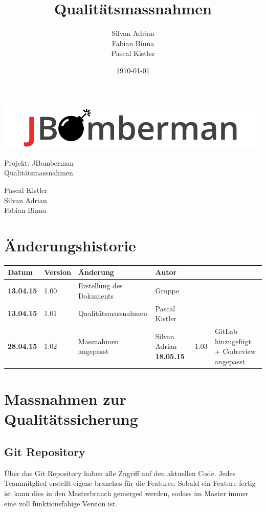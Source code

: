 \documentclass[11pt]{scrartcl}
\title{Qualitätsmassnahmen}
\author{Silvan Adrian \\ Fabian Binna \\ Pascal Kistler}
\date{\today{}}
\begin{document}
\def\arraystretch{1.5}
\begin{titlepage}
\begin{center}
\vspace{10em}
\includegraphics[scale=2]{jbomberman}
\vspace{10em}
\end{center}
\begin{center}
\huge {Projekt: JBomberman} \\
\huge {Qualitätsmassnahmen}
\end{center}
\begin{center}
\vspace{10em}
\LARGE {Pascal Kistler} \\
\LARGE {Silvan Adrian} \\
\LARGE {Fabian Binna}
\end{center}

\end{titlepage}

\newpage
\section{Änderungshistorie}
\label{sec:Änderungen}

\begin{tabularx}{\linewidth}{l l l l}
\textbf{Datum} & \textbf{Version} & \textbf{Änderung}  & \textbf{Autor} \\
\hline
\textbf{13.04.15} & 1.00 & Erstellung des Dokuments & Gruppe \\
\textbf{13.04.15} & 1.01 & Qualitätsmassnahmen & Pascal Kistler \\
\bf{28.04.15} & 1.02 & Massnahmen angepasst & Silvan Adrian
\bf{18.05.15} & 1.03 & GitLab hinzugefügt + Codreview angepasst \\
\end{tabularx}

\newpage
\tableofcontents
\newpage


\section{Massnahmen zur Qualitätssicherung}
\subsection{Git Repository}
Über das Git Repository haben alle Zugriff auf den aktuellen Code.
Jedes Teammitglied erstellt eigene branches für die Features.
Sobald ein Feature fertig ist kann dies in den Masterbranch gemerged werden, 
sodass im Master immer eine voll funktionsfähige Version  ist.
\end{document}
